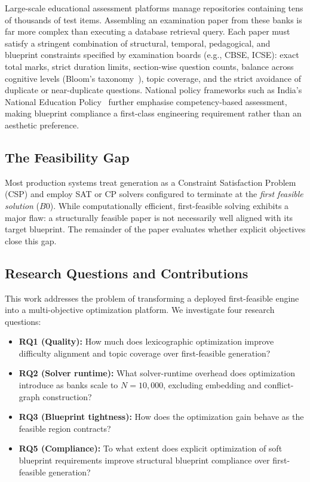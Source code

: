 \documentclass[runningheads]{llncs}
\begin{document}
Large-scale educational assessment platforms manage repositories containing tens of thousands of test items.
Assembling an examination paper from these banks is far more complex than executing a database retrieval query.
Each paper must satisfy a stringent combination of structural, temporal, pedagogical, and blueprint constraints specified by examination boards (e.g., CBSE, ICSE): exact total marks, strict duration limits, section-wise question counts, balance across cognitive levels (Bloom's taxonomy~\cite{bloom1956,anderson2001}), topic coverage, and the strict avoidance of duplicate or near-duplicate questions.
National policy frameworks such as India's National Education Policy~\cite{moenep2020} further emphasise competency-based assessment, making blueprint compliance a first-class engineering requirement rather than an aesthetic preference.

\subsection{The Feasibility Gap}
Most production systems treat generation as a Constraint Satisfaction Problem (CSP) and employ SAT or CP solvers configured to terminate at the \emph{first feasible solution} ($B0$).
While computationally efficient, first-feasible solving exhibits a major flaw: a structurally feasible paper is not necessarily well aligned with its target blueprint. The remainder of the paper evaluates whether explicit objectives close this gap.

\subsection{Research Questions and Contributions}
This work addresses the problem of transforming a deployed first-feasible engine into a multi-objective optimization platform.
We investigate four research questions:
\begin{itemize}
    \item \textbf{RQ1 (Quality):} How much does lexicographic optimization improve difficulty alignment and topic coverage over first-feasible generation?
    \item \textbf{RQ2 (Solver runtime):} What solver-runtime overhead does optimization introduce as banks scale to $N=10{,}000$, excluding embedding and conflict-graph construction?
    \item \textbf{RQ3 (Blueprint tightness):} How does the optimization gain behave as the feasible region contracts?
    \item \textbf{RQ5 (Compliance):} To what extent does explicit optimization of soft blueprint requirements improve structural blueprint compliance over first-feasible generation?
\end{itemize}
\end{document}
